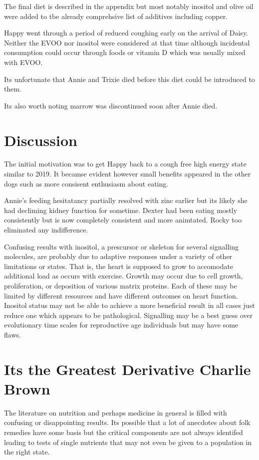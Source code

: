 The final diet is described in the appendix   but most notably
inositol and olive oil were added to tbe already comprehsive list
of additives including copper.

Happy went through a period of reduced coughing early on the arrival
of Daisy. Neither the EVOO nor inositol were considered at that time
although incidental consumption could occur through foods or vitamin
D which was usually mixed with EVOO. 

Its unfortunate that Annie and Trixie died before this diet could
be introduced to them.

Its also worth noting marrow was discontinued soon after Annie died.


\mjmtol{
}

\section{Discussion}
The initial motivation was to get Happy back to a cough free high
energy state similar to 2019. It becamse evident however small
benefits appeared in the other dogs such as more consisent enthusiasm
about eating. 

Annie's feeding hesitatancy partially resolved with zinc earlier but
its likely she had decliming kidney function for sometime. Dexter had
been eating mostly consistently but is now completely consistent and
more animtated. Rocky too eliminated any indifference. 

Confusing results with inositol, a prescursor or skeleton for
several signalling molecules, are probably due to adaptive
responses under a variety of other limitations or states.
That is, the heart is supposed to grow to accomodate additional
load as occurs with exercise. Growth may occur due to cell growth,
proliferation, or deposition of various matrix proteins. Each of
these may be limited by different resources and have different outcomes
on heart function. Inositol status may not be able to achieve a more
beneficial result in all cases just reduce one which appears to be
pathological. Signalling may be a best guess over evolutionary time
scales for reproductive age individuals but may have some flaws. 
 



\section{Its the Greatest Derivative Charlie Brown }

The literature on nutrition and perhaps medicine in general
is filled with confusing or disappointing results. 
Its possible that a lot of anecdotes about folk remedies have
some basis but the critical components are not always identifed
leading to tests of single nutrients that may not even be given
to a population in the right state. 

